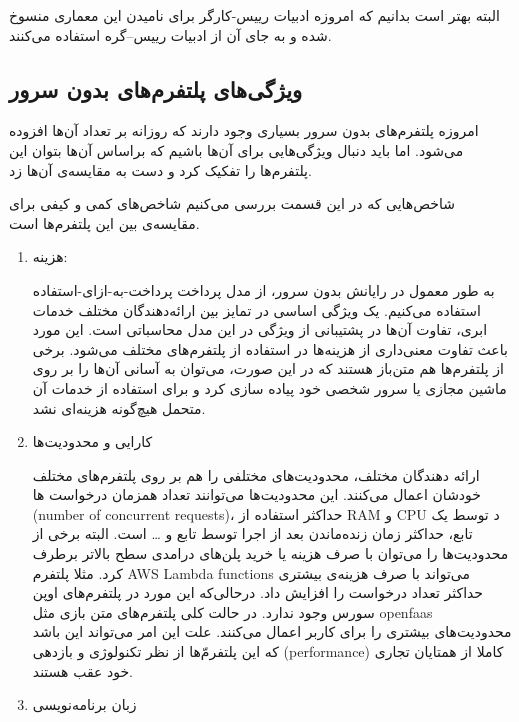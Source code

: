 البته بهتر است بدانیم که امروزه ادبیات رییس-کارگر برای نامیدن این معماری منسوخ شده و به جای آن از ادبیات رییس--گره استفاده می‌کنند. 

\subsection{ویژگی‌های پلتفرم‌های بدون سرور}
امروزه پلتفرم‌‌های بدون سرور بسیاری وجود دارند که روزانه بر تعداد آن‌ها افزوده می‌شود. اما باید دنبال ویژگی‌هایی برای آن‌ها باشیم که براساس آن‌ها بتوان این پلتفرم‌ها را تفکیک کرد و دست به مقایسه‌ی آن‌ها زد. 

شاخص‌هایی که در این قسمت بررسی می‌کنیم شاخص‌های کمی و کیفی برای مقایسه‌ی بین این پلتفرم‌ها است. 

\begin{enumerate}
	\item هزینه:
	
	به طور معمول در رایانش بدون سرور، از مدل پرداخت پرداخت-به-ازای-استفاده استفاده می‌کنیم. یک ویژگی اساسی در تمایز بین ارائه‌دهندگان مختلف خدمات ابری، تفاوت آن‌ها در پشتیبانی از ویژگی  در این مدل محاسباتی است. این مورد باعث تفاوت معنی‌داری از هزینه‌ها در استفاده از پلتفرم‌‌های مختلف می‌شود. برخی از پلتفرم‌ها هم متن‌باز هستند که در این صورت، می‌توان به آسانی آن‌ها را بر روی ماشین مجازی یا سرور شخصی خود پیاده سازی کرد و برای استفاده از خدمات آن متحمل هیچ‌گونه هزینه‌ای نشد.
	
	\item کارایی و محدودیت‌ها
	
	 ارائه دهندگان مختلف، محدودیت‌های مختلفی را هم بر روی پلتفرم‌های مختلف خودشان اعمال می‌کنند. این محدودیت‌ها می‌توانند تعداد همزمان درخواست ها (number of concurrent requests)، حداکثر استفاده از RAM و CPU د توسط یک تابع، حداکثر زمان زنده‌ماندن بعد از اجرا توسط تابع و … است. البته برخی از محدودیت‌ها را می‌توان با صرف هزینه یا خرید پلن‌های درامدی سطح بالاتر برطرف کرد. مثلا پلتفرم AWS Lambda functions می‌تواند با صرف هزینه‌ی بیشتری حداکثر تعداد درخواست را افزایش داد. درحالی‌که این مورد در پلتفرم‌های اوپن سورس وجود ندارد. در حالت کلی پلتفرم‌های متن بازی مثل openfaas محدودیت‌های بیشتری را برای کاربر اعمال می‌کنند. علت این امر می‌تواند این باشد که این پلتفرم‌ّها از نظر تکنولوژی و بازدهی (performance) کاملا از همتایان تجاری خود عقب هستند. 
	
	 \item زبان برنامه‌نویسی
	 

\end{enumerate}
